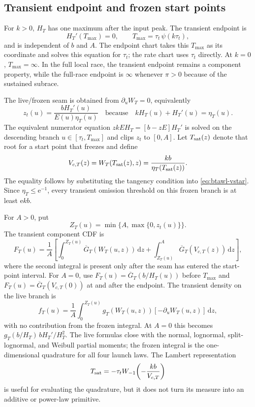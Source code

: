 \documentclass[12pt]{article}
\newcommand{\dd}{\,\mathrm{d}}
\newcommand{\e}{\mathrm{e}}
\theoremstyle{remark}
\begin{document}
\subsection{Transient endpoint and frozen start points}
\label{sec:btawl-endpoint}
For $k>0$, $H_T$ has one maximum after the input peak.  The transient endpoint is
\begin{equation}
  H_T'(T_{\max})=0,
  \qquad T_{\max}=\tau_t\,\psi(k\tau_t),
  \label{eq:btawl-tmax}
\end{equation}
and is independent of $b$ and $A$.  The endpoint chart takes this $T_{\max}$ as its coordinate and solves this equation for $\tau_t$; the rate chart uses $\tau_t$ directly.  At $k=0$, $T_{\max}=\infty$.  In the full local race, the transient endpoint remains a component property, while the full-race endpoint is $\infty$ whenever $\pi>0$ because of the sustained subrace.

The live/frozen seam is obtained from $\partial_uW_T=0$, equivalently
\begin{equation}
  z_t(u)=\frac{bH_T'(u)}{E(u)\eta_T(u)}
  \quad\text{because}\quad kH_T(u)+H_T'(u)=\eta_T(u).
  \label{eq:btawl-tangency}
\end{equation}
The equivalent numerator equation $zkE H_T=[b-zE]H_T'$ is solved on the descending branch $u\in[\tau_t,T_{\max}]$ and clips $z_t$ to $[0,A]$.  Let $T_{\rm sat}(z)$ denote that root for a start point that freezes and define
\begin{equation}
  V_{c,T}(z)=W_T(T_{\rm sat}(z),z)
            =\frac{kb}{\eta_T(T_{\rm sat}(z))}.
  \label{eq:btawl-crit}
\end{equation}
The equality follows by substituting the tangency condition into
\eqref{eq:btawl-vstar}.  Since $\eta_T\le\e^{-1}$, every transient omission
threshold on this frozen branch is at least $\e kb$.

For $A>0$, put
\[
  Z_T(u)=\min\{A,\max\{0,z_t(u)\}\}.
\]
The transient component CDF is
\begin{equation}
  F_T(u)=\frac1A\left[
    \int_0^{Z_T(u)}\overline G_T(W_T(u,z))\dd z+
    \int_{Z_T(u)}^A\overline G_T(V_{c,T}(z))\dd z
  \right],
  \label{eq:btawl-cdf}
\end{equation}
where the second integral is present only after the seam has entered the start-point interval.  For $A=0$, use $F_T(u)=\overline G_T(b/H_T(u))$ before $T_{\max}$ and $F_T(u)=\overline G_T(V_{c,T}(0))$ at and after the endpoint.  The transient density on the live branch is
\begin{equation}
  f_T(u)=\frac1A\int_0^{Z_T(u)}
     g_T(W_T(u,z))[-\partial_uW_T(u,z)]\dd z ,
  \label{eq:btawl-pdf}
\end{equation}
with no contribution from the frozen integral.  At $A=0$ this becomes $g_T(b/H_T)\,bH_T'/H_T^2$.  The live formulas close with the normal, lognormal, split-lognormal, and Weibull partial moments; the frozen integral is the one-dimensional quadrature for all four launch laws. The Lambert representation
\[
  T_{\rm sat}=-\tau_tW_{-1}\!\left(-\frac{kb}{V_{c,T}}\right)
\]
is useful for evaluating the quadrature, but it does not turn its measure into an additive or power-law primitive.
\end{document}
